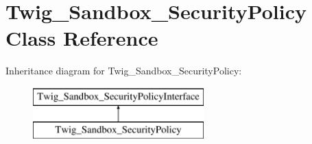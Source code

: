 \hypertarget{class_twig___sandbox___security_policy}{}\section{Twig\+\_\+\+Sandbox\+\_\+\+Security\+Policy Class Reference}
\label{class_twig___sandbox___security_policy}
Inheritance diagram for Twig\+\_\+\+Sandbox\+\_\+\+Security\+Policy\+:\begin{figure}[H]
\begin{center}
\leavevmode
\includegraphics[height=2.000000cm]{class_twig___sandbox___security_policy}
\end{center}
\end{figure}
